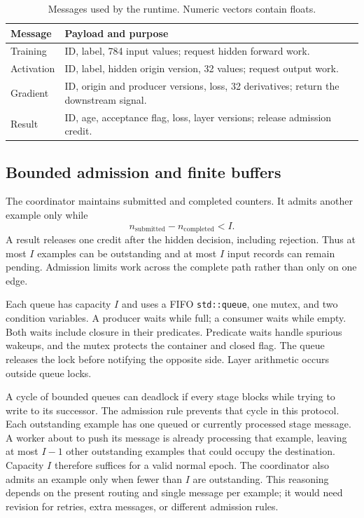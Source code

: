 \documentclass[conference]{IEEEtran}
\begin{document}
\begin{table}[t]
\caption{Messages used by the runtime. Numeric vectors contain floats.}\label{tab:messages}
\centering\small
\begin{tabular}{p{}p{}}
\toprule Message & Payload and purpose \\\midrule
Training & ID, label, 784 input values; request hidden forward work.\\
Activation & ID, label, hidden origin version, 32 values; request output work.\\
Gradient & ID, origin and producer versions, loss, 32 derivatives; return the downstream signal.\\
Result & ID, age, acceptance flag, loss, layer versions; release admission credit.\\\bottomrule
\end{tabular}
\end{table}

\subsection{Bounded admission and finite buffers}
The coordinator maintains submitted and completed counters. It admits another example only while
\begin{equation}
 n_{\mathrm{submitted}}-n_{\mathrm{completed}}<I.\label{eq:window}
\end{equation}
A result releases one credit after the hidden decision, including rejection. Thus at most $I$ examples can be outstanding and at most $I$ input records can remain pending. Admission limits work across the complete path rather than only on one edge.

Each queue has capacity $I$ and uses a FIFO \texttt{std::queue}, one mutex, and two condition variables. A producer waits while full; a consumer waits while empty. Both waits include closure in their predicates. Predicate waits handle spurious wakeups, and the mutex protects the container and closed flag. The queue releases the lock before notifying the opposite side. Layer arithmetic occurs outside queue locks.

A cycle of bounded queues can deadlock if every stage blocks while trying to write to its successor. The admission rule prevents that cycle in this protocol. Each outstanding example has one queued or currently processed stage message. A worker about to push its message is already processing that example, leaving at most $I-1$ other outstanding examples that could occupy the destination. Capacity $I$ therefore suffices for a valid normal epoch. The coordinator also admits an example only when fewer than $I$ are outstanding. This reasoning depends on the present routing and single message per example; it would need revision for retries, extra messages, or different admission rules.
\end{document}
